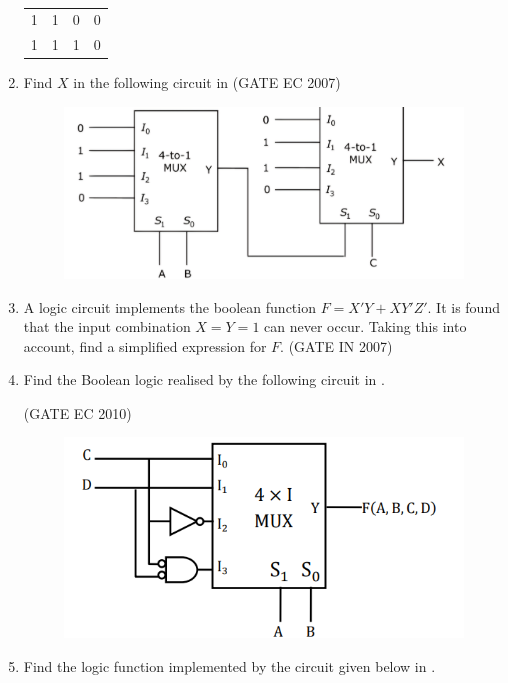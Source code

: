 \begin{enumerate}[label=\arabic*.,ref=\theenumi]
\begin{table}[H]
\begin{tabular}{|l|l|l|c|}
	1&1&0&0\\
	1&1&1&0\\
	\hline
\end{tabular}
\caption{}
\label{tab:2019/c/6/c}
\end{table}
%
\item 
Find $X$ in the following circuit in 
\hfill (GATE EC 2007)
\label{prob:2007-gate-ec-43}
\begin{figure}[H]
\centering
	\includegraphics[width=0.75\columnwidth]{figs/2007-gate-ec-43.png}
\caption{}
\label{fig:2007-gate-ec-43}
\end{figure}
\item 
\label{prob:2007-gate-in-10}
      A logic circuit implements the boolean function $F=X'Y+XY'Z'$. It is found that the input combination $X=Y=1$ can never occur. Taking this into account, find a simplified expression for $F$. 
\hfill (GATE IN 2007)
\item 
\label{prob:2010-gate-ec-39}
Find the Boolean logic realised by the following circuit in 
.

\hfill (GATE EC 2010)
\begin{figure}[H]
\centering
	\includegraphics[width=0.5\columnwidth]{figs/2010-gate-ec-39.png}
\caption{}
\label{fig:2010-gate-ec-39}
\end{figure}
\item 
\label{prob:2011-gate-ec-20}
Find the logic function implemented by the circuit given below 
in 
.


\end{enumerate}
